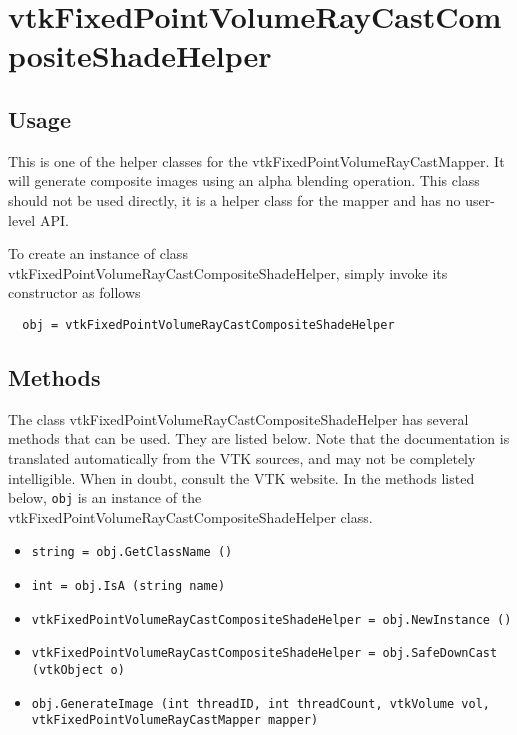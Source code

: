 \section{vtkFixedPointVolumeRayCastCompositeShadeHelper}

\subsection{Usage}

 This is one of the helper classes for the vtkFixedPointVolumeRayCastMapper.
 It will generate composite images using an alpha blending operation.
 This class should not be used directly, it is a helper class for
 the mapper and has no user-level API.


To create an instance of class vtkFixedPointVolumeRayCastCompositeShadeHelper, simply
invoke its constructor as follows
\begin{verbatim}
  obj = vtkFixedPointVolumeRayCastCompositeShadeHelper
\end{verbatim}
\subsection{Methods}

The class vtkFixedPointVolumeRayCastCompositeShadeHelper has several methods that can be used.
  They are listed below.
Note that the documentation is translated automatically from the VTK sources,
and may not be completely intelligible.  When in doubt, consult the VTK website.
In the methods listed below, \verb|obj| is an instance of the vtkFixedPointVolumeRayCastCompositeShadeHelper class.
\begin{itemize}
\item  \verb|string = obj.GetClassName ()|

\item  \verb|int = obj.IsA (string name)|

\item  \verb|vtkFixedPointVolumeRayCastCompositeShadeHelper = obj.NewInstance ()|

\item  \verb|vtkFixedPointVolumeRayCastCompositeShadeHelper = obj.SafeDownCast (vtkObject o)|

\item  \verb|obj.GenerateImage (int threadID, int threadCount, vtkVolume vol, vtkFixedPointVolumeRayCastMapper mapper)|

\end{itemize}
